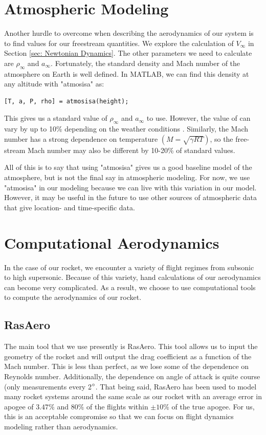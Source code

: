 \documentclass[12pt]{report}
\begin{document}
\section{Atmospheric Modeling}
Another hurdle to overcome when describing the aerodynamics of our system is to find values for our \gls{freestream} quantities. We explore the calculation of $V_{\infty}$ in Section \ref{sec: Newtonian Dynamics}. The other parameters we need to calculate are $\rho_{\infty}$ and $a_{\infty}$. Fortunately, the standard density and Mach number of the atmosphere on Earth is well defined. In MATLAB, we can find this density at any altitude with "atmosisa" as:
\begin{lstlisting}[style=Matlab-editor]
    [T, a, P, rho] = atmosisa(height);
\end{lstlisting}
This gives us a standard value of $\rho_{\infty}$ and $a_{\infty}$ to use. However, the value of can vary by up to 10\% depending on the weather conditions \cite{svickova_air_2020}. Similarly, the Mach number has a strong dependence on temperature $\left(M=\sqrt{\gamma RT}\right)$, so the free-stream Mach number may also be different by 10-20\% of standard values. 

All of this is to say that using "atmosisa" gives us a good baseline model of the atmosphere, but is not the final say in atmospheric modeling. For now, we use "atmosisa" in our modeling because we can live with this variation in our model. However, it may be useful in the future to use other sources of atmospheric data that give location- and time-specific data.
\section{Computational Aerodynamics}
In the case of our rocket, we encounter a variety of flight regimes from subsonic to high supersonic. Because of this variety, hand calculations of our aerodynamics can become very complicated. As a result, we choose to use computational tools to compute the aerodynamics of our rocket.
\subsection{RasAero}
The main tool that we use presently is RasAero. This tool allows us to input the geometry of the rocket and will output the drag coefficient as a function of the Mach number. This is less than perfect, as we lose some of the dependence on Reynolds number. Additionally, the dependence on angle of attack is quite course (only measurements every 2$\degree$. That being said, RasAero has been used to model many rocket systems around the same scale as our rocket with an average error in apogee of $3.47\%$ and $80\%$ of the flights within $\pm10\%$ of the true apogee. For us, this is an acceptable compromise so that we can focus on flight dynamics modeling rather than aerodynamics.
\end{document}
